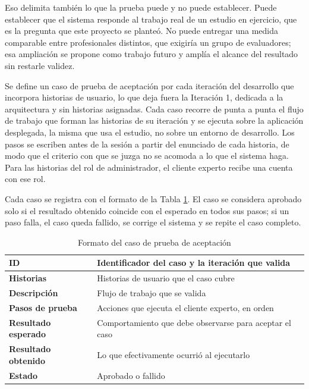 \documentclass[12pt,letterpaper,oneside]{report}
\begin{document}
Eso delimita también lo que la prueba puede y no puede establecer. Puede establecer que el sistema responde al trabajo real de un estudio en ejercicio, que es la pregunta que este proyecto se planteó. No puede entregar una medida comparable entre profesionales distintos, que exigiría un grupo de evaluadores; esa ampliación se propone como trabajo futuro y amplía el alcance del resultado sin restarle validez.

Se define un caso de prueba de aceptación por cada iteración del desarrollo que incorpora historias de usuario, lo que deja fuera la Iteración 1, dedicada a la arquitectura y sin historias asignadas. Cada caso recorre de punta a punta el flujo de trabajo que forman las historias de su iteración y se ejecuta sobre la aplicación desplegada, la misma que usa el estudio, no sobre un entorno de desarrollo. Los pasos se escriben antes de la sesión a partir del enunciado de cada historia, de modo que el criterio con que se juzga no se acomoda a lo que el sistema haga. Para las historias del rol de administrador, el cliente experto recibe una cuenta con ese rol.

Cada caso se registra con el formato de la Tabla \ref{tab:formatoaceptacion}. El caso se considera aprobado solo si el resultado obtenido coincide con el esperado en todos sus pasos; si un paso falla, el caso queda fallido, se corrige el sistema y se repite el caso completo.

\begin{table}[H]
  \centering
  \caption{Formato del caso de prueba de aceptación}
  \label{tab:formatoaceptacion}
  \renewcommand{\arraystretch}{1.3}
  \begin{tabular}{|>{\raggedright\arraybackslash}p{3.6cm}|p{9.4cm}|}
    \hline
    \textbf{ID} & Identificador del caso y la iteración que valida \\ \hline
    \textbf{Historias} & Historias de usuario que el caso cubre \\ \hline
    \textbf{Descripción} & Flujo de trabajo que se valida \\ \hline
    \textbf{Pasos de prueba} & Acciones que ejecuta el cliente experto, en orden \\ \hline
    \textbf{Resultado esperado} & Comportamiento que debe observarse para aceptar el caso \\ \hline
    \textbf{Resultado obtenido} & Lo que efectivamente ocurrió al ejecutarlo \\ \hline
    \textbf{Estado} & Aprobado o fallido \\ \hline
  \end{tabular}
\end{table}
\end{document}
